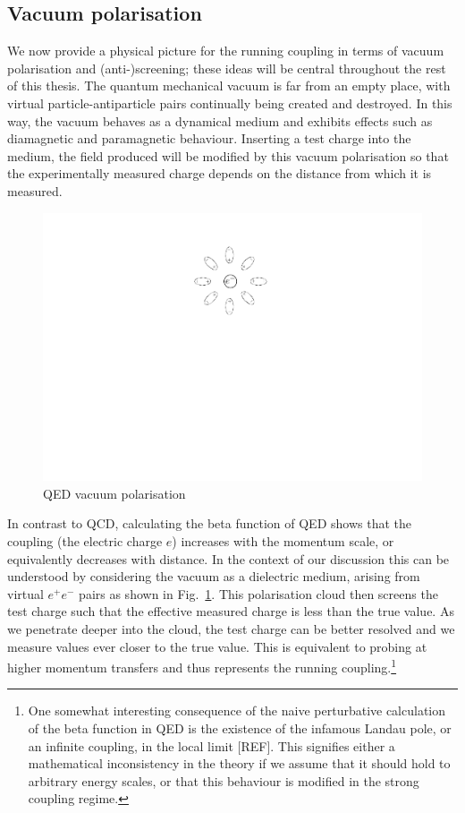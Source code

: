 \documentclass[12pt, a4paper, twoside]{book}
\begin{document}
\subsection{Vacuum polarisation}
\label{sec:VacPol}
We now provide a physical picture for the running coupling in terms of vacuum polarisation and (anti-)screening; these ideas will be central throughout the rest of this thesis. The quantum mechanical vacuum is far from an empty place, with virtual particle-antiparticle pairs continually being created and destroyed. In this way, the vacuum behaves as a dynamical medium and exhibits effects such as diamagnetic and paramagnetic behaviour. Inserting a test charge into the medium, the field produced will be modified by this vacuum polarisation so that the experimentally measured charge depends on the distance from which it is measured.
\begin{figure}[t]
	\centering
	\includegraphics{QEDVacPol}
	\caption{QED vacuum polarisation}
	\label{fig:QEDVacPol}
\end{figure}
In contrast to QCD, calculating the beta function of QED shows that the coupling (the electric charge \(e\)) increases with the momentum scale, or equivalently decreases with distance. In the context of our discussion this can be understood by considering the vacuum as a dielectric medium, arising from virtual \(e^+e^-\) pairs as shown in Fig.~\ref{fig:QEDVacPol}. This polarisation cloud then screens the test charge such that the effective measured charge is less than the true value. As we penetrate deeper into the cloud, the test charge can be better resolved and we measure values ever closer to the true value. This is equivalent to probing at higher momentum transfers and thus represents the running coupling.\footnote{One somewhat interesting consequence of the naive perturbative calculation of the beta function in QED is the existence of the infamous Landau pole, or an infinite coupling, in the local limit [REF]. This signifies either a mathematical inconsistency in the theory if we assume that it should hold to arbitrary energy scales, or that this behaviour is modified in the strong coupling regime.}
\end{document}
